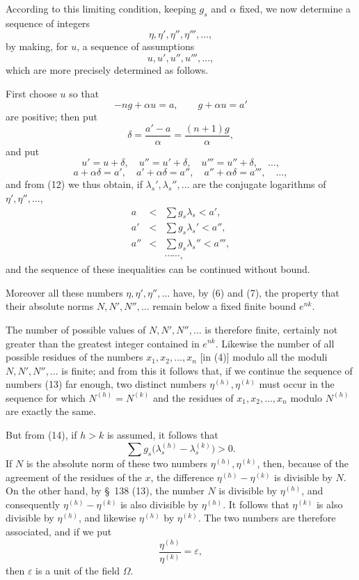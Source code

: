 \documentclass[11pt]{article}
\begin{document}
According to this limiting condition, keeping $g_s$ and $\alpha$ fixed, we now determine a sequence of integers
\begin{equation}
\eta,\eta',\eta'',\eta''',\ldots,
\tag{13}
\end{equation}
by making, for $u$, a sequence of assumptions
\[
u,u',u'',u''',\ldots,
\]
which are more precisely determined as follows.

First choose $u$ so that
\[
-ng+\alpha u=a,
\qquad
 g+\alpha u=a'
\]
are positive; then put
\[
\delta=\frac{a'-a}{\alpha}=\frac{(n+1)g}{\alpha},
\]
and put
\[
u'=u+\delta,
\quad
u''=u'+\delta,
\quad
u'''=u''+\delta,
\quad\ldots,
\]
\[
a+\alpha\delta=a',
\quad a'+\alpha\delta=a'',
\quad a''+\alpha\delta=a''',
\quad\ldots,
\]
and from (12) we thus obtain, if $\lambda_s',\lambda_s'',\ldots$ are the conjugate logarithms of $\eta',\eta'',\ldots$,
\begin{equation}
\begin{array}{rcl}
a&<&\sum g_s\lambda_s<a',\\
a'&<&\sum g_s\lambda_s'<a'',\\
a''&<&\sum g_s\lambda_s''<a''',\\
&&\cdots\cdots,
\end{array}
\tag{14}
\end{equation}
and the sequence of these inequalities can be continued without bound.

Moreover all these numbers $\eta,\eta',\eta'',\ldots$ have, by (6) and (7), the property that their absolute norms $N,N',N'',\ldots$ remain below a fixed finite bound $e^{nk}$.

The number of possible values of $N,N',N'',\ldots$ is therefore finite, certainly not greater than the greatest integer contained in $e^{nk}$. Likewise the number of all possible residues of the numbers $x_1,x_2,\ldots,x_n$ [in (4)] modulo all the moduli $N,N',N'',\ldots$ is finite; and from this it follows that, if we continue the sequence of numbers (13) far enough, two distinct numbers $\eta^{(h)},\eta^{(k)}$ must occur in the sequence for which $N^{(h)}=N^{(k)}$ and the residues of $x_1,x_2,\ldots,x_n$ modulo $N^{(h)}$ are exactly the same.

But from (14), if $h>k$ is assumed, it follows that
\begin{equation}
\sum g_s\bigl(\lambda_s^{(h)}-\lambda_s^{(k)}\bigr)>0.
\tag{15}
\end{equation}
If $N$ is the absolute norm of these two numbers $\eta^{(h)},\eta^{(k)}$, then, because of the agreement of the residues of the $x$, the difference $\eta^{(h)}-\eta^{(k)}$ is divisible by $N$. On the other hand, by \S~138 (13), the number $N$ is divisible by $\eta^{(h)}$, and consequently $\eta^{(h)}-\eta^{(k)}$ is also divisible by $\eta^{(h)}$. It follows that $\eta^{(k)}$ is also divisible by $\eta^{(h)}$, and likewise $\eta^{(h)}$ by $\eta^{(k)}$. The two numbers are therefore associated, and if we put
\[
\frac{\eta^{(h)}}{\eta^{(k)}}=\varepsilon,
\]
then $\varepsilon$ is a unit of the field $\Omega$.
\end{document}
